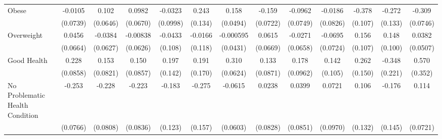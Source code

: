 {\begin{tabular}{l*{12}{c}}
\addlinespace
Obese       &     -0.0105         &       0.102         &      0.0982         &     -0.0323         &       0.243         &       0.158\sym{**} &      -0.159\sym{*}  &     -0.0962         &     -0.0186         &      -0.378\sym{***}&      -0.272\sym{*}  &      -0.309\sym{***}\\
            &    (0.0739)         &    (0.0646)         &    (0.0670)         &    (0.0998)         &     (0.134)         &    (0.0494)         &    (0.0722)         &    (0.0749)         &    (0.0826)         &     (0.107)         &     (0.133)         &    (0.0746)         \\
\addlinespace
Overweight  &      0.0456         &     -0.0384         &    -0.00838         &     -0.0433         &     -0.0166         &   -0.000595         &      0.0615         &     -0.0271         &     -0.0695         &       0.156         &       0.148         &      0.0382         \\
            &    (0.0664)         &    (0.0627)         &    (0.0626)         &     (0.108)         &     (0.118)         &    (0.0431)         &    (0.0669)         &    (0.0658)         &    (0.0724)         &     (0.107)         &     (0.100)         &    (0.0507)         \\
\addlinespace
Good Health &       0.228\sym{**} &       0.153         &       0.150         &       0.197         &       0.191         &       0.310\sym{***}&       0.133         &       0.178         &       0.142         &       0.262         &      -0.348         &       0.570         \\
            &    (0.0858)         &    (0.0821)         &    (0.0857)         &     (0.142)         &     (0.170)         &    (0.0624)         &    (0.0871)         &    (0.0962)         &     (0.105)         &     (0.150)         &     (0.221)         &     (0.352)         \\
\addlinespace
No Problematic Health Condition&      -0.253\sym{***}&      -0.228\sym{**} &      -0.223\sym{**} &      -0.183         &      -0.275         &     -0.0615         &      0.0238         &      0.0399         &      0.0721         &       0.106         &      -0.176         &       0.114         \\
            &    (0.0766)         &    (0.0808)         &    (0.0836)         &     (0.123)         &     (0.157)         &    (0.0603)         &    (0.0828)         &    (0.0851)         &    (0.0970)         &     (0.132)         &     (0.145)         &    (0.0721)         \\

\end{tabular}}

